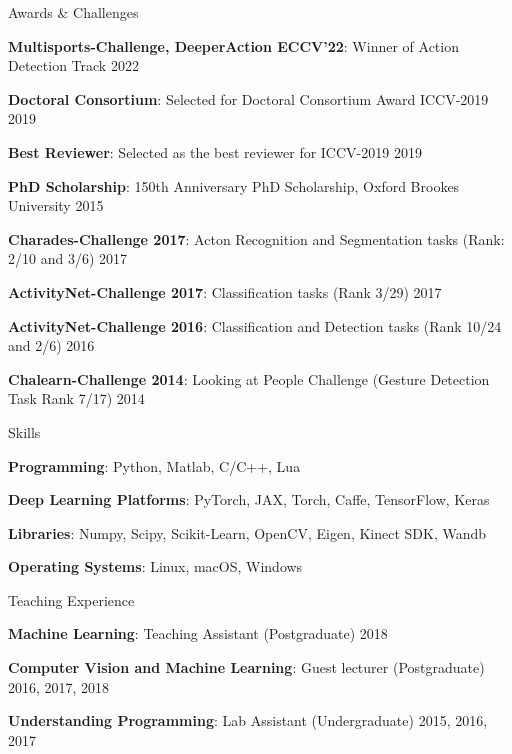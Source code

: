 \documentclass{resume_long} %
\begin{document}
\vspace{0.1in}
\begin{rSection}{Awards \& Challenges}{} \itemsep -2pt
\item \textbf{Multisports-Challenge, DeeperAction ECCV'22}: Winner of Action Detection Track \hfill 2022
\item \textbf{Doctoral Consortium}: Selected for Doctoral Consortium Award ICCV-2019 \hfill 2019
\item \textbf{Best Reviewer}: Selected as the best reviewer for ICCV-2019 \hfill 2019
\item \textbf{PhD Scholarship}: 150th Anniversary PhD Scholarship, Oxford Brookes University \hfill 2015
\item \textbf{Charades-Challenge 2017}: Acton Recognition and Segmentation tasks (Rank: 2/10 and 3/6) \hfill 2017
\item \textbf{ActivityNet-Challenge 2017}: Classification tasks (Rank 3/29)  \hfill 2017
\item \textbf{ActivityNet-Challenge 2016}: Classification and Detection tasks (Rank 10/24 and 2/6) \hfill 2016
\item \textbf{Chalearn-Challenge 2014}: Looking at People Challenge (Gesture Detection Task Rank 7/17) \hfill 2014
\end{rSection}


\vspace{0.1in}
\begin{rSection}{Skills}{} \itemsep -2pt
\item  \textbf{Programming}: Python, Matlab, C/C++, Lua
\item  \textbf{Deep Learning Platforms}: PyTorch, JAX, Torch, Caffe, TensorFlow, Keras
\item  \textbf{Libraries}: Numpy, Scipy, Scikit-Learn, OpenCV, Eigen, Kinect SDK, Wandb
\item  \textbf{Operating Systems}: Linux, macOS, Windows
\end{rSection}

\vspace{0.1in}
\begin{rSection}{Teaching Experience}{} \itemsep -2pt
  \item  \textbf{Machine Learning}: Teaching Assistant (Postgraduate) \hfill 2018
  \item  \textbf{Computer Vision and Machine Learning}: Guest lecturer (Postgraduate) \hfill 2016, 2017, 2018
  \item  \textbf{Understanding Programming}: Lab Assistant (Undergraduate)  \hfill 2015, 2016, 2017
\end{rSection}
\end{document}
